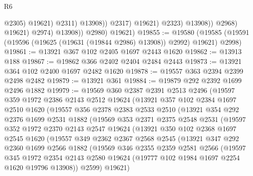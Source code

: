 \begin{lexlean}{R6}
\begin{coremodule}
                                      @2305)
                                    @19621)
                                  @2311)
                                @13908))
                            @2317)
                          @19621)
                        @2323)
                      @13908))
                  @2968)
                @19621)
              @2974)
            @13908))
        @2980)
      @19621)
@19855 := @19580
    (@19585 (@19591 (@19596 (@19625 (@19631 (@19844 @2986) @13908)) @2992) @19621) @2998)
@19861 := @13921 @367 @102 @2405 @1697 @2443 @1620
@19862 := @13913 @188
@19867 := @19862 @366 @2402 @2404 @2484 @2443
@19873 := @13921 @364 @102 @2400 @1697 @2482 @1620
@19878 := @19557 @363 @2394 @2399 @2498 @2482
@19879 := @13921 @361
@19884 := @19879 @292 @2392 @1699 @2496 @1882
@19979 := @19569
    @360
    @2387
    @2391
    @2513
    @2496
    (@19597
      @359
      @1972
      @2386
      @2143
      @2512
      @19624
      (@13921
        @357
        @102
        @2384
        @1697
        @2510
        @1620
        (@19557
          @356
          @2378
          @2383
          @2533
          @2510
          (@13921
            @354
            @292
            @2376
            @1699
            @2531
            @1882
            (@19569
              @353
              @2371
              @2375
              @2548
              @2531
              (@19597
                @352
                @1972
                @2370
                @2143
                @2547
                @19624
                (@13921
                  @350
                  @102
                  @2368
                  @1697
                  @2545
                  @1620
                  (@19557
                    @349
                    @2362
                    @2367
                    @2568
                    @2545
                    (@13921
                      @347
                      @292
                      @2360
                      @1699
                      @2566
                      @1882
                      (@19569
                        @346
                        @2355
                        @2359
                        @2581
                        @2566
                        (@19597
                          @345
                          @1972
                          @2354
                          @2143
                          @2580
                          @19624
                          (@19777 @102 @1984 @1697 @2254 @1620 @19796 @13908))
                        @2599)
                      @19621)

\end{coremodule}
\end{lexlean}
